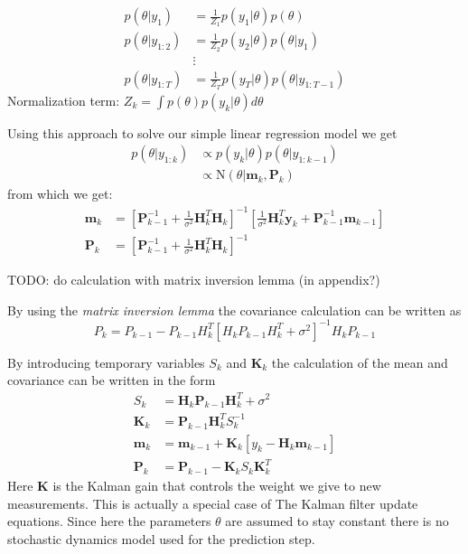 \begin{align*}
  p(\theta | y_{1}) &= \frac{1}{Z_1} p(y_1 | \theta) p(\theta) \\
  p(\theta | y_{1:2}) &= \frac{1}{Z_2} p(y_2 | \theta) p(\theta | y_1) \\
                    &\vdots \\
  p(\theta | y_{1:T}) &= \frac{1}{Z_T} p(y_T | \theta) p(\theta | y_{1:T-1})
\end{align*}
Normalization term: $Z_k = \int p(\theta) p(y_k | \theta) d\theta$ %


Using this approach to solve our simple linear regression model we get
\begin{align}
  p(\theta | y_{1:k}) &\propto p(y_k | \theta) p(\theta | y_{1:k-1}) \\
                      &\propto \text{N}(\theta | \mathbf{m}_k, \mathbf{P}_k)
\end{align}
from which we get:
\begin{align}
  \mathbf{m}_k &= \left[ \mathbf{P}^{-1}_{k-1}
                 + \frac{1}{\sigma^2} \mathbf{H}^T_k \mathbf{H}_k \right]^{-1}
                 \left[\frac{1}{\sigma^2} \mathbf{H}^T_k \mathbf{y}_k +
                 \mathbf{P}^{-1}_{k-1} \mathbf{m}_{k-1} \right] \\
  \mathbf{P}_k &= \left[\mathbf{P}_{k-1}^{-1}
                 + \frac{1}{\sigma^2} \mathbf{H}^T_k \mathbf{H}_k \right]^{-1}
\end{align}

TODO: do calculation with matrix inversion lemma (in appendix?)

By using the \textit{matrix inversion lemma} the covariance calculation can be
written as
$$ P_k = P_{k-1} - P_{k-1} H_k^T [H_k P_{k-1} H_k^T + \sigma^2]^{-1} H_k P_{k-1} $$

By introducing temporary variables $S_k$ and $\mathbf{K}_k$ the calculation of
the mean and covariance can be written in the form
\begin{align*}
     S_k &= \textbf{H}_k \textbf{P}_{k-1} \textbf{H}^T_k + \sigma^2 \\
     \textbf{K}_k &= \textbf{P}_{k-1} \textbf{H}^T_k S_k^{-1} \\
     \textbf{m}_k &= \textbf{m}_{k-1} + \textbf{K}_k [y_k - \textbf{H}_k \textbf{m}_{k-1}] \\
     \textbf{P}_k &= \textbf{P}_{k-1} - \textbf{K}_k S_k \textbf{K}_k^T
\end{align*}
Here $\mathbf{K}$ is the Kalman gain that controls the weight we give to new
measurements.
This is actually a special case of The Kalman filter update equations.
Since here the parameters $\theta$ are assumed to stay constant there is
no stochastic dynamics model used for the prediction step.

